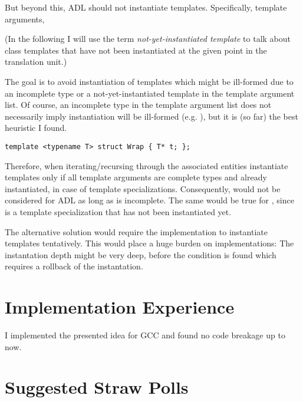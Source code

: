 But beyond this, ADL should not instantiate templates. Specifically, template arguments, 

(In the following I will use the term \emph{not-yet-instantiated template} to talk about 
class templates that have not been instantiated at the given point in the translation 
unit.)

The goal is to avoid instantiation of templates which might be ill-formed due to an 
incomplete type or a not-yet-instantiated template in the template argument list. Of 
course, an incomplete type in the template argument list does not necessarily imply 
instantiation will be ill-formed (e.g. ), but it is (so far) the best heuristic 
I found.
\begin{lstlisting}[style=Vc,float,label=lst:wrap2,caption={
Different definition of \type{Wrap} which doesn't make the initial example ill-formed.
}]
template <typename T> struct Wrap { T* t; };
\end{lstlisting}
Therefore, when iterating/recursing through the associated entities instantiate templates 
only if all template arguments are complete types and already instantiated, in case of 
template specializations. Consequently,  would not be considered 
for ADL as long as  is incomplete. The same would be true for 
, since  is a template specialization 
that has not been instantiated yet.

The alternative solution would require the implementation to instantiate templates 
tentatively. This would place a huge burden on implementations: The instantation depth 
might be very deep, before the condition is found which requires a rollback of the 
instantation.

\section{Implementation Experience}
I implemented the presented idea for GCC and found no code breakage up to now.

\section{Suggested Straw Polls}


